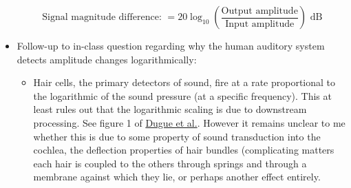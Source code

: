\documentclass{article}
\begin{document}
\begin{itemize}
\[ \textrm{Signal magnitude difference: } = 20 \log_{10} \left( \frac{\textrm{Output amplitude}}{\textrm{Input amplitude}} \right) \textrm{ dB} \]

\item Follow-up to in-class question regarding why the human auditory system detects amplitude changes logarithmically:

\begin{itemize}
\item Hair cells, the primary detectors of sound, fire at a rate proportional to the logarithmic of the sound pressure (at a specific frequency). This at least rules out that the logarithmic scaling is due to downstream processing. See figure 1 of \href{http://www.ncbi.nlm.nih.gov/pmc/articles/PMC2147667/#!po=19.2308}{Dugue et al.}. However it remains unclear to me whether this is due to some property of sound transduction into the cochlea, the deflection properties of hair bundles (complicating matters each hair is coupled to the others through springs and through a membrane against which they lie, or perhaps another effect entirely.
\end{itemize}

\end{itemize}
\end{document}
